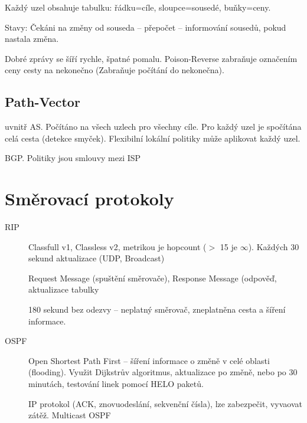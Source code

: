 \documentclass[a4paper, 11pt]{report}
\begin{document}
Každý uzel obsahuje tabulku: řádku=cíle, sloupce=sousedé, buňky=ceny.

Stavy: Čekáni na změny od souseda -- přepočet -- informování sousedů, pokud nastala změna.

Dobré zprávy se šíří rychle, špatné pomalu. Poison-Reverse zabraňuje označením ceny cesty na nekonečno (Zabraňuje počítání do nekonečna).

\subsection{Path-Vector}
uvnitř AS. Počítáno na všech uzlech pro všechny cíle. Pro každý uzel je spočítána celá cesta (detekce smyček). Flexibilní lokální politiky může aplikovat každý uzel.

BGP. Politiky jsou smlouvy mezi ISP


\section{Směrovací protokoly}
\begin{description}
	\item[RIP] Classfull v1, Classless v2, metrikou je hopcount ($>$ 15 je $\infty$). Každých 30 sekund aktualizace (UDP, Broadcast)
	
	Request Message (spuštění směrovače), Response Message (odpověď, aktualizace tabulky
	
	180 sekund bez odezvy -- neplatný směrovač, zneplatněna cesta a šíření informace.
	
	\item[OSPF] Open Shortest Path First -- šíření informace o změně v celé oblasti (flooding). Využit Dijkstrův algoritmus, aktualizace po změně, nebo po 30 minutách, testování linek pomocí HELO paketů.
	
	IP protokol (ACK, znovuodeslání, sekvenční čísla), lze zabezpečit, vyvaovat zátěž. Multicast OSPF
\end{description}
\end{document}
